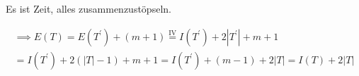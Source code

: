 \begin{solution}
\begin{enumerate}[label = \alph*]
    Es ist Zeit, alles zusammenzustöpseln.

    \begin{multline*}
        \implies
        E(T)
        =
        E(T^\prime) + (m + 1)
        \stackrel
        {
            \mathrm{IV}
        }{=}
        I(T^\prime) + 2 |T^\prime| + m + 1 \\
        =
        I(T^\prime) + 2 (|T| - 1) + m + 1
        =
        I(T^\prime) + (m - 1) + 2 |T|
        =
        I(T) + 2 |T|
    \end{multline*}

\end{enumerate}

\end{solution}

